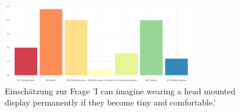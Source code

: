 
\begin{figure}[H]
	\centering
	\includegraphics[width=0.75\textwidth]{./_StudyResults/permanentWearing}
	\caption{Einschätzung zur Frage 'I can imagine wearing a head mounted display permanently if they become tiny and comfortable.'}
	\label{fig:permanentWearing}
\end{figure}